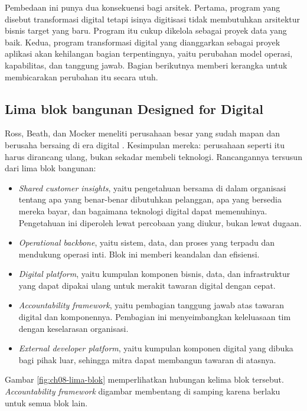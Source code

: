 Pembedaan ini punya dua konsekuensi bagi arsitek. Pertama, program yang disebut
transformasi digital tetapi isinya digitisasi tidak membutuhkan arsitektur bisnis target
yang baru. Program itu cukup dikelola sebagai proyek data yang baik. Kedua, program
transformasi digital yang dianggarkan sebagai proyek aplikasi akan kehilangan bagian
terpentingnya, yaitu perubahan model operasi, kapabilitas, dan tanggung jawab. Bagian
berikutnya memberi kerangka untuk membicarakan perubahan itu secara utuh.

\subsection*{Lima blok bangunan Designed for Digital}

Ross, Beath, dan Mocker meneliti perusahaan besar yang sudah mapan dan berusaha bersaing di
era digital \cite{ross2019}. Kesimpulan mereka: perusahaan seperti itu harus dirancang
ulang, bukan sekadar membeli teknologi. Rancangannya tersusun dari lima blok bangunan:

\begin{itemize}
  \item \textit{Shared customer insights}, yaitu pengetahuan bersama di dalam organisasi
        tentang apa yang benar-benar dibutuhkan pelanggan, apa yang bersedia mereka bayar,
        dan bagaimana teknologi digital dapat memenuhinya. Pengetahuan ini diperoleh lewat
        percobaan yang diukur, bukan lewat dugaan.
  \item \textit{Operational backbone}, yaitu sistem, data, dan proses yang terpadu dan
        mendukung operasi inti. Blok ini memberi keandalan dan efisiensi.
  \item \textit{Digital platform}, yaitu kumpulan komponen bisnis, data, dan infrastruktur
        yang dapat dipakai ulang untuk merakit tawaran digital dengan cepat.
  \item \textit{Accountability framework}, yaitu pembagian tanggung jawab atas tawaran
        digital dan komponennya. Pembagian ini menyeimbangkan keleluasaan tim dengan
        keselarasan organisasi.
  \item \textit{External developer platform}, yaitu kumpulan komponen digital yang dibuka
        bagi pihak luar, sehingga mitra dapat membangun tawaran di atasnya.
\end{itemize}

Gambar \ref{fig:ch08-lima-blok} memperlihatkan hubungan kelima blok tersebut.
\textit{Accountability framework} digambar membentang di samping karena berlaku untuk semua
blok lain.

